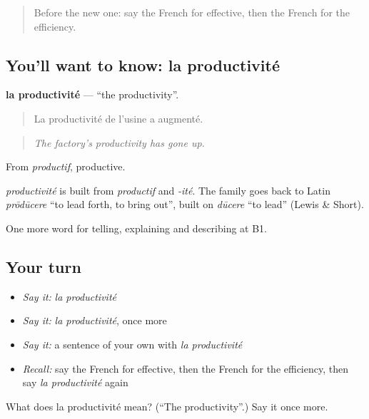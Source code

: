 \label{lesson:FR-C361-productivite}



\begin{quote}
Before the new one: say the French for effective, then the French for the efficiency.
\end{quote}

\subsection*{You'll want to know: la productivité}
\textbf{la productivité} — \textquotedblleft{}the productivity\textquotedblright{}.

\begin{quote}
La productivité de l'usine a augmenté.
\end{quote}

\begin{quote}
\emph{The factory's productivity has gone up.}
\end{quote}

From \emph{productif}, productive.

\begin{cousinweb}
\emph{productivité} is built from \emph{productif} and \emph{-ité}. The family goes back to Latin \emph{prōdūcere} \textquotedblleft{}to lead forth, to bring out\textquotedblright{}, built on \emph{dūcere} \textquotedblleft{}to lead\textquotedblright{} (Lewis \& Short).
\end{cousinweb}

\begin{grammarlens}[title={What you've built}]
One more word for telling, explaining and describing at B1.
\end{grammarlens}

\subsection*{Your turn}
\begin{itemize}
\raggedright
  \item \emph{Say it:} \emph{la productivité}
  \item \emph{Say it:} \emph{la productivité}, once more
  \item \emph{Say it:} a sentence of your own with \emph{la productivité}
  \item \emph{Recall:} say the French for effective, then the French for the efficiency, then say \emph{la productivité} again
\end{itemize}

\begin{tcolorbox}[breakable,colback=teal!4,colframe=teal!35!black,title={Before you move on}]
What does la productivité mean? (\textquotedblleft{}The productivity\textquotedblright{}.) Say it once more.
\end{tcolorbox}
